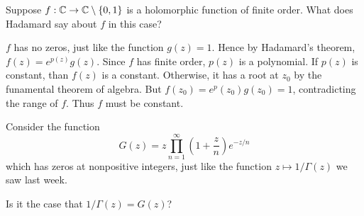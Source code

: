 \documentclass{homework}
\begin{document}
                \begin{problem}
                  Suppose $f : \mathbb{C} \to \mathbb{C} \setminus \{0, 1\}$ is a holomorphic function
                    of finite order.  What does Hadamard say about $f$ in this case?
                    \end{problem}
                    \begin{solution}
                    $f$ has no zeros, just like the function $g(z) = 1$. Hence by Hadamard's theorem, $f(z) = e^{p(z)}g(z)$. Since $f$ has finite order, $p(z)$ is a polynomial. If $p(z)$ is constant, than $f(z)$ is a constant. Otherwise, it has a root at $z_0$ by the funamental theorem of algebra. But $f(z_0) = e^p(z_0)g(z_0) = 1$, contradicting the range of $f$. Thus $f$ must be constant.
                    \end{solution}
                    \begin{problem}
                      Consider the function
                        \[
                            G(z) = z \prod_{n=1}^\infty \left( 1 + \frac{z}{n} \right) e^{-z/n}
                              \]
                                which has zeros at nonpositive integers, just like the function
                                  $z \mapsto 1/\Gamma(z)$ we saw last week.

                                    Is it the case that $1/\Gamma(z) = G(z)$?
                                    \end{problem}
\end{document}

